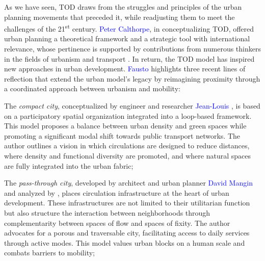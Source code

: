 \begin{refsegment}
As we have seen, \acrshort{TOD} draws from the struggles and principles of the urban planning movements that preceded it, while readjusting them to meet the challenges of the 21\textsuperscript{st} century. \textcolor{blue}{Peter Calthorpe}, in conceptualizing \acrshort{TOD}, offered urban planning a theoretical framework and a strategic tool with international relevance, whose pertinence is supported by contributions from numerous thinkers in the fields of urbanism and transport \textcolor{blue}{\autocite[111]{almeida_correia_transit-oriented_2020}}. In return, the \acrshort{TOD} model has inspired new approaches in urban development. \textcolor{blue}{Fausto} \textcolor{blue}{\textcite[122]{lo_feudo_scenario_2014}} highlights three recent lines of reflection that extend the urban model's legacy by reimagining proximity through a coordinated approach between urbanism and mobility:
\begin{customitemize}
\item The \textsl{compact city}, conceptualized by engineer and researcher \textcolor{blue}{Jean-Louis} \textcolor{blue}{\textcite{maupu_ville_2006}}, is based on a participatory spatial organization integrated into a loop-based framework. This model proposes a balance between urban density and green spaces while promoting a significant modal shift towards public transport networks. The author outlines a vision in which circulations are designed to reduce distances, where density and functional diversity are promoted, and where natural spaces are fully integrated into the urban fabric;
\item The \textsl{pass-through city}, developed by architect and urban planner \textcolor{blue}{David Mangin} and analyzed by \textcolor{blue}{\textcite{masboungi_ville_2008}}, places circulation infrastructure at the heart of urban development. These infrastructures are not limited to their utilitarian function but also structure the interaction between neighborhoods through complementarity between spaces of flow and spaces of fixity. The author advocates for a porous and traversable city, facilitating access to daily services through active modes. This model values urban blocks on a human scale and combats barriers to mobility;

\end{customitemize}
\end{refsegment}
